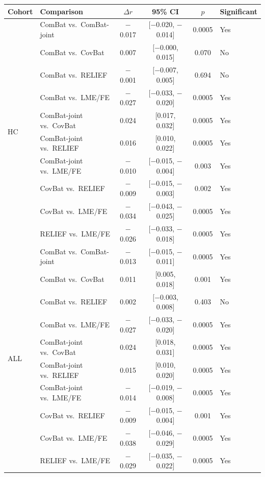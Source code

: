 \documentclass[12pt,a4paper]{article}
\begin{document}
\vspace{4mm}
\begin{table}[H]
\centering
\begin{tabular}{llcccl}
\toprule
\textbf{Cohort} & \textbf{Comparison} & {$\Delta r$} & \textbf{95\% CI} & {$p$} & \textbf{Significant} \\
\midrule
\multirow{10}{*}{HC}
  & ComBat vs.\ ComBat-joint & $-$0.017 & [$-$0.020, $-$0.014] & 0.0005 & Yes \\
  & ComBat vs.\ CovBat & 0.007 & [$-$0.000, 0.015] & 0.070 & No \\
  & ComBat vs.\ RELIEF & $-$0.001 & [$-$0.007, 0.005] & 0.694 & No \\
  & ComBat vs.\ LME/FE & $-$0.027 & [$-$0.033, $-$0.020] & 0.0005 & Yes \\
  & ComBat-joint vs.\ CovBat & 0.024 & [0.017, 0.032] & 0.0005 & Yes \\
  & ComBat-joint vs.\ RELIEF & 0.016 & [0.010, 0.022] & 0.0005 & Yes \\
  & ComBat-joint vs.\ LME/FE & $-$0.010 & [$-$0.015, $-$0.004] & 0.003 & Yes \\
  & CovBat vs.\ RELIEF & $-$0.009 & [$-$0.015, $-$0.003] & 0.002 & Yes \\
  & CovBat vs.\ LME/FE & $-$0.034 & [$-$0.043, $-$0.025] & 0.0005 & Yes \\
  & RELIEF vs.\ LME/FE & $-$0.026 & [$-$0.033, $-$0.018] & 0.0005 & Yes \\
\midrule
\multirow{10}{*}{ALL}
  & ComBat vs.\ ComBat-joint & $-$0.013 & [$-$0.015, $-$0.011] & 0.0005 & Yes \\
  & ComBat vs.\ CovBat & 0.011 & [0.005, 0.018] & 0.001 & Yes \\
  & ComBat vs.\ RELIEF & 0.002 & [$-$0.003, 0.008] & 0.403 & No \\
  & ComBat vs.\ LME/FE & $-$0.027 & [$-$0.033, $-$0.020] & 0.0005 & Yes \\
  & ComBat-joint vs.\ CovBat & 0.024 & [0.018, 0.031] & 0.0005 & Yes \\
  & ComBat-joint vs.\ RELIEF & 0.015 & [0.010, 0.020] & 0.0005 & Yes \\
  & ComBat-joint vs.\ LME/FE & $-$0.014 & [$-$0.019, $-$0.008] & 0.0005 & Yes \\
  & CovBat vs.\ RELIEF & $-$0.009 & [$-$0.015, $-$0.004] & 0.001 & Yes \\
  & CovBat vs.\ LME/FE & $-$0.038 & [$-$0.046, $-$0.029] & 0.0005 & Yes \\
  & RELIEF vs.\ LME/FE & $-$0.029 & [$-$0.035, $-$0.022] & 0.0005 & Yes \\
\bottomrule
\end{tabular}
\end{table}
\end{document}
